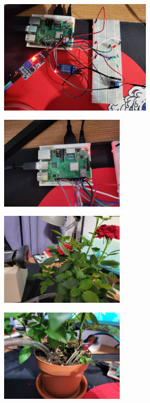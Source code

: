 \documentclass[12pt]{article}
\begin{document}
\begin{figure}[ht]
    \centering
    \includegraphics[width=0.65\textwidth]{images/image14.jpeg}
\end{figure} 

\newpage

\begin{figure}[ht]
    \centering
    \includegraphics[width=0.53\textwidth]{images/image15.jpeg}
\end{figure} 

\begin{figure}[ht]
    \centering
    \includegraphics[width=0.53\textwidth]{images/image16.jpeg}
\end{figure} 

\begin{figure}[ht]
    \centering
    \includegraphics[width=0.53\textwidth]{images/image17.jpeg}
\end{figure} 
\end{document}
